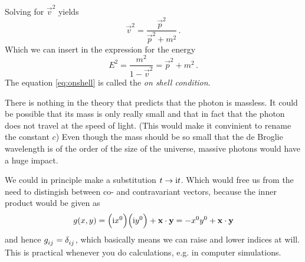 Solving for $\vec{v}^2$ yields
\begin{equation}
\vec{v}^2=\frac{\vec{p}^2}{\vec{p}^2+m^2}\, .
\end{equation}
Which we can insert in the expression for the energy
\begin{equation}
E^2=\frac{m^2}{1-\vec{v}^2}=\vec{p}^2+m^2 \label{eq:onshell}\, .
\end{equation}
The equation \eqref{eq:onshell} is called the \emph{on shell condition}.
\begin{sidenote}
There is nothing in the theory that predicts that the photon is massless. It
could be possible that its mass is only really small and that in fact that the
photon does not travel at the speed of light. (This would make it
convinient to rename the constant $c$) Even though the mass should be so small
that the de Broglie wavelength is of the order of the size of the universe,
massive photons would have a huge impact.
\end{sidenote}
\begin{sidenote}
We could in principle make a substitution $t\to \mathrm{i} t$. Which would free us
from the need to distingish between co- and contravariant vectors, because the
inner product would be given as
\begin{equation}
g(x,y)=\left(\imI x^0\right)\left(\imI
y^0\right)+\vec{x}\cdot\vec{y}=-x^0y^0+\vec{x}\cdot\vec{y}
\end{equation}
and hence $\tensor{g}{_i_j}=\tensor{\delta}{_i_j}$, which basically means we can
raise and lower indices at will. This is practical whenever you do calculations,
e.g. in computer simulations.
\end{sidenote}
